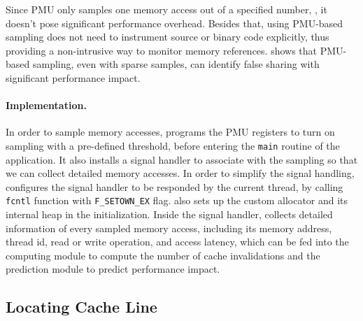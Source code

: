 Since PMU only samples one memory access out of a specified number, , it doesn't pose significant performance overhead. Besides that, using PMU-based sampling does not need to instrument source or binary code explicitly, thus providing a non-intrusive way to monitor memory references. \cheetah{} shows that PMU-based sampling, even with sparse samples, can identify false sharing with significant performance impact.
 

\paragraph{Implementation.} 

In order to sample memory accesses, \cheetah{} programs the PMU registers to turn on sampling with a pre-defined threshold, before entering the \texttt{main} routine of the application. It also installs a signal handler to associate with the sampling so that we can collect detailed memory accesses. In order to simplify the signal handling, \Cheetah{} configures the signal handler to be responded by the current thread, by calling \texttt{fcntl} function with \texttt{F\_SETOWN\_EX} flag. \cheetah{} also sets up the custom allocator and its internal heap in the initialization.
Inside the signal handler, \Cheetah{} collects detailed information of every sampled memory access, including its memory address, thread id, read or write operation, and access latency, which can be fed into the computing module to compute the number of cache invalidations and the prediction module to predict performance impact.

\subsection{Locating Cache Line}
\label{sec:shadow}

